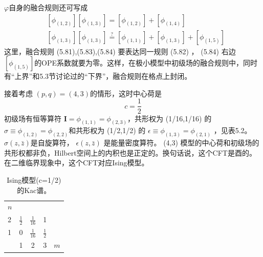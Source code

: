 $\varphi $自身的融合规则还可写成
\begin{align} &\left[\phi_{(1,2)}\right]\left[\phi_{(1,3)}\right]=\left[\phi_{(1,2)}\right]+\left[\phi_{(1,4)}\right]\\ &\left[\phi_{(1,3)}\right]\left[\phi_{(1,3)}\right] \stackrel{?}{=}\left[\phi_{(1,1)}\right]+\left[\phi_{(1,3)}\right]+\left[\phi_{(1,5)}\right] \end{align}
这里，融合规则 (5.81),(5.83),(5.84) 要表达同一规则 (5.82) ， (5.84) 右边 $\left[\phi_{(1,5)}\right] $的OPE系数就要为零。这样，在极小模型中初级场的融合规则中，同时有“上界”和5.3节讨论过的“下界”，融合规则在格点上封闭。

接着考虑 $(p,q)=(4,3) $的情形，这时中心荷是
$$
c=\frac{1}{2}
$$
初级场有恒等算符 $\boldsymbol{I}=\phi_{(1,1)}=\phi_{(2,3)} $，共形权为 (1/16,1/16) 的 $\sigma \equiv \phi_{(1,2)}=\phi_{(2,2)} $和共形权为 (1/2,1/2) 的 $\epsilon \equiv \phi_{(1,3)}=\phi_{(2,1)}$ ，见表5.2。 $\sigma(z, \bar{z}) $是自旋算符， $\epsilon(z, \bar{z})$ 是能量密度算符。 (4,3) 模型的中心荷和初级场的共形权都非负，Hilbert空间上的内积也是正定的。换句话说，这个CFT是酉的。在二维临界现象中，这个CFT对应Ising模型。
\begin{table}[h]
	\centering
		\begin{tabular}{l|cccc}
			$n$ &               &                &               &     \\
			2   & $\frac{1}{2}$ & $\frac{1}{16}$ & 1             &     \\
			1   & 0             & $\frac{1}{16}$ & $\frac{1}{2}$ &     \\ \hline
			& 1             & 2              & 3             & $m$
		\end{tabular}
	\caption{Ising模型(c=1/2)的Kac谱。}
\end{table}

